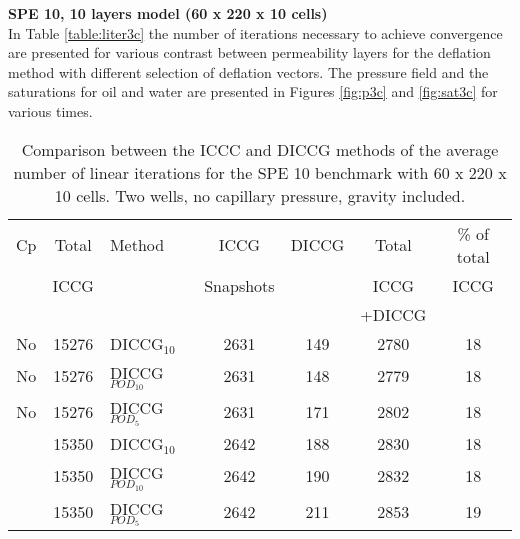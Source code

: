 \documentclass[12pt]{article}
\begin{document}
\newpage
\textbf{SPE 10, 10 layers model (60 x 220 x 10 cells)}\\
In Table \ref{table:liter3c} the number of iterations necessary to achieve convergence are presented for various contrast between permeability layers for the deflation method with different selection of deflation vectors. 
The pressure field and the saturations for oil and water are presented in Figures \ref{fig:p3c} and \ref{fig:sat3c} for various times.
\begin{table}[!h]\centering
\begin{minipage}{1\textwidth}
 \centering
\begin{tabular}{ ||c|c||l|c|c|c|c||} 
\hline
Cp&Total&Method  & ICCG&DICCG &Total&\% of total\\ 
                           & ICCG     &  & Snapshots& &ICCG& ICCG\\ 
                            &     &  & & &+DICCG& \\
\hline 
No &15276& DICCG$_{10}$&2631&149&2780&18\\ 
\hline  
No &15276& DICCG$_{POD_{10}}$&2631&148&2779&18 \\ 
\hline  
No &15276& DICCG$_{POD_{5}}$&2631&171&2802&18 \\ 
\hline  
 &15350& DICCG$_{10}$&2642&188&2830&18\\ 
\hline  
 &15350& DICCG$_{POD_{10}}$&2642&190&2832&18 \\ 
\hline  
&15350& DICCG$_{POD_{5}}$&2642&211&2853&19 \\ 
\hline 
\end{tabular} 
\caption{Comparison between the ICCC and DICCG methods of the average number of linear iterations for the SPE 10 benchmark with 60 x 220 x 10 cells. Two wells, no capillary pressure, gravity included.}\label{table:literspe1} 
\end{minipage}  
\end{table}  
% 
\end{document}
